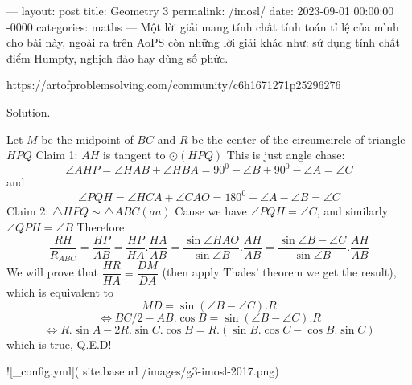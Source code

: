 ---
layout: post
title: Geometry 3
permalink: /imosl/
date: 2023-09-01 00:00:00 -0000
categories: maths
---
Một lời giải mang tính chất tính toán tỉ lệ của mình cho bài này, ngoài ra trên AoPS còn những lời giải khác như: sử dụng tính chất điểm Humpty, nghịch đảo hay dùng số phức.

https://artofproblemsolving.com/community/c6h1671271p25296276

Solution.

Let $M$ be the midpoint of $BC$ and $R$ be the center of the circumcircle of triangle $HPQ$
Claim 1: $AH$ is tangent to $\odot(HPQ)$
This is just angle chase: 
$$\angle AHP=\angle HAB+\angle HBA=90^0-\angle B+90^0-\angle A=\angle C$$
 and 
 $$\angle PQH=\angle HCA+\angle CAO=180^0-\angle A-\angle B=\angle C$$
 Claim 2: $\triangle HPQ \sim \triangle ABC (aa)$
Cause we have $\angle PQH=\angle C$, and similarly $\angle QPH=\angle B$
Therefore 
$$\dfrac{RH}{R_{ABC}}=\dfrac{HP}{AB}=\dfrac{HP}{HA}.\dfrac{HA}{AB}=\dfrac{\sin \angle HAO}{\sin \angle B}.\dfrac{AH}{AB}=\dfrac{\sin \angle B-\angle C}{\sin \angle B}.\dfrac{AH}{AB}$$
 We will prove that $\dfrac{HR}{HA}=\dfrac{DM}{DA}$ (then apply Thales' theorem we get the result), which is equivalent to
$$MD=\sin (\angle B-\angle C).R $$ $$\Leftrightarrow BC/2-AB.\cos B=\sin (\angle B-\angle C).R $$
$$\Leftrightarrow R.\sin A-2R.\sin C.\cos B=R.(\sin B.\cos C-\cos B.\sin C)$$
 which is true, Q.E.D!

![_config.yml]({{ site.baseurl }}/images/g3-imosl-2017.png)
